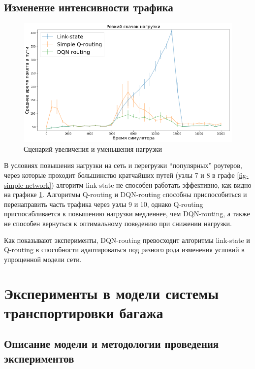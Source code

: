 \documentclass[specification, annotation]{itmo-student-thesis}
\begin{document}
\subsection{Изменение интенсивности трафика}\label{experiments:simple/load}

\begin{figure}[!h]
  \caption{Сценарий увеличения и уменьшения нагрузки}\label{experiment-peak-load}
  \centering
  \includegraphics[scale=0.6]{experiment-peak-load}
\end{figure}

В условиях повышения нагрузки на сеть и перегрузки ``популярных'' роутеров,
через которые проходит большинство кратчайших путей (узлы 7 и 8 в графе
\ref{fig-simple-network}) алгоритм link-state не способен работать эффективно,
как видно на графике \ref{experiment-peak-load}. Алгоритмы Q-routing и
DQN-routing cпособны приспособиться и перенаправить часть трафика через узлы 9 и
10, однако Q-routing приспосабливается к повышению нагрузки медленнее, чем
DQN-routing, а также не способен вернуться к оптимальному поведению при снижении
нагрузки.

Как показывают эксперименты, DQN-routing превосходит алгоритмы link-state и
Q-routing в способности адаптироваться под разного рода изменения условий в
упрощенной модели сети.

\section{Эксперименты в модели системы транспортировки багажа}\label{experiments:conveyors}

\subsection{Описание модели и методологии проведения экспериментов}
\end{document}
